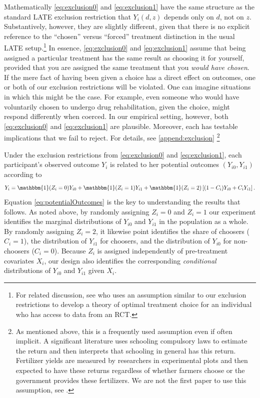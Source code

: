 \documentclass[ecta,nameyear,final]{econsocart}
\begin{document}
Mathematically \eqref{eq:exclusion0} and \eqref{eq:exclusion1} have the same structure as the standard LATE exclusion restriction that $Y_i(d,z)$ depends only on $d$, not on $z$. 
Substantively, however, they are slightly different, given that there is no explicit reference to the ``chosen'' versus ``forced'' treatment distinction in the usual LATE setup.\footnote{For related discussion, see \cite{chamberlain2011bayesian} who uses an assumption similar to our exclusion restrictions to develop a theory of optimal treatment choice for an individual who has access to data from an RCT.} 
In essence, \eqref{eq:exclusion0} and \eqref{eq:exclusion1} assume that being assigned a particular treatment has the same result as choosing it for yourself, provided that you are assigned the same treatment that you \emph{would have chosen}. 
If the mere fact of having been given a choice has a direct effect on outcomes, one or both of our exclusion restrictions will be violated.
One can imagine situations in which this might be the case.
For example, even someone who would have voluntarily chosen to undergo drug rehabilitation, given the choice, might respond differently when coerced.
In our empirical setting, however, both \eqref{eq:exclusion0} and \eqref{eq:exclusion1} are plausible. 
Moreover, each has testable implications that we fail to reject.
For details, see \ref{append:exclusion} \footnote{As mentioned above, this is a frequently used assumption even if often implicit. A significant literature uses schooling compulsory laws to estimate the return and then interprets that schooling in general has this return. Fertilizer yields are measured by researchers in experimental plots and then expected to have these returns regardless of whether farmers choose or the government provides these fertilizers. We are not the first paper to use this assumption, see \cite{chamberlain2011bayesian}.}


Under the exclusion restrictions from \eqref{eq:exclusion0} and \eqref{eq:exclusion1}, each participant's observed outcome $Y_i$ is related to her potential outcomes $(Y_{i0}, Y_{i1})$ according to  
\begin{equation}
    Y_i = \mathbbm{1}(Z_i =0) Y_{i0} + \mathbbm{1}(Z_i = 1)  Y_{i1}  + \mathbbm{1}(Z_i = 2) \left[(1 - C_i) Y_{i0} + C_i Y_{i1} \right].
\label{eq:potentialOutcomes}
\end{equation}
Equation \ref{eq:potentialOutcomes} is the key to understanding the results that follows. 
As noted above, by randomly assigning $Z_i=0$ and $Z_i = 1$ our experiment identifies the marginal distributions of $Y_{i0}$ and $Y_{i1}$ in the population as a whole. 
By randomly assigning $Z_i=2$, it likewise point identifies the share of choosers ($C_i = 1$), the distribution of $Y_{i1}$ for choosers, and the distribution of $Y_{i0}$ for non-choosers ($C_i = 0$).
Because $Z_i$ is assigned independently of pre-treatment covariates $X_i$, our design also identifies the corresponding \emph{conditional} distributions of $Y_{i0}$ and $Y_{i1}$ given $X_i$. 
\end{document}
